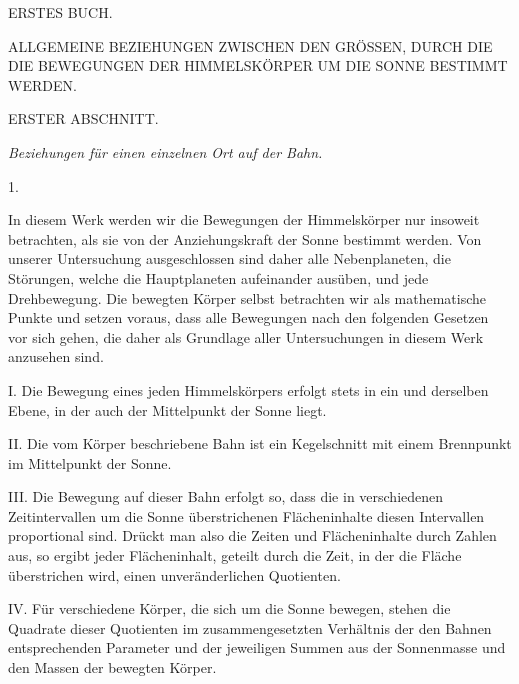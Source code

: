 \clearpage
{}
\begin{center}
{\Large ERSTES BUCH.}\par\bigskip
{\large ALLGEMEINE BEZIEHUNGEN ZWISCHEN DEN GRÖSSEN, DURCH DIE DIE BEWEGUNGEN DER HIMMELSKÖRPER UM DIE SONNE BESTIMMT WERDEN.}\par\bigskip
{}
{\large ERSTER ABSCHNITT.}\par\medskip
\emph{Beziehungen für einen einzelnen Ort auf der Bahn.}\par\bigskip
{}1.
\end{center}
In diesem Werk werden wir die Bewegungen der Himmelskörper nur insoweit betrachten, als sie von der Anziehungskraft der Sonne bestimmt werden. Von unserer Untersuchung ausgeschlossen sind daher alle Nebenplaneten, die Störungen, welche die Hauptplaneten aufeinander ausüben, und jede Drehbewegung. Die bewegten Körper selbst betrachten wir als mathematische Punkte und setzen voraus, dass alle Bewegungen nach den folgenden Gesetzen vor sich gehen, die daher als Grundlage aller Untersuchungen in diesem Werk anzusehen sind.

I. Die Bewegung eines jeden Himmelskörpers erfolgt stets in ein und derselben Ebene, in der auch der Mittelpunkt der Sonne liegt.

II. Die vom Körper beschriebene Bahn ist ein Kegelschnitt mit einem Brennpunkt im Mittelpunkt der Sonne.

III. Die Bewegung auf dieser Bahn erfolgt so, dass die in verschiedenen
Zeitintervallen um die Sonne überstrichenen Flächeninhalte diesen Intervallen proportional sind. Drückt man also die Zeiten und Flächeninhalte durch Zahlen aus, so ergibt jeder Flächeninhalt, geteilt durch die Zeit, in der die Fläche überstrichen wird, einen unveränderlichen Quotienten.

IV. Für verschiedene Körper, die sich um die Sonne bewegen, stehen die Quadrate dieser Quotienten im zusammengesetzten Verhältnis der den Bahnen entsprechenden Parameter und der jeweiligen Summen aus der Sonnenmasse und den Massen der bewegten Körper.


